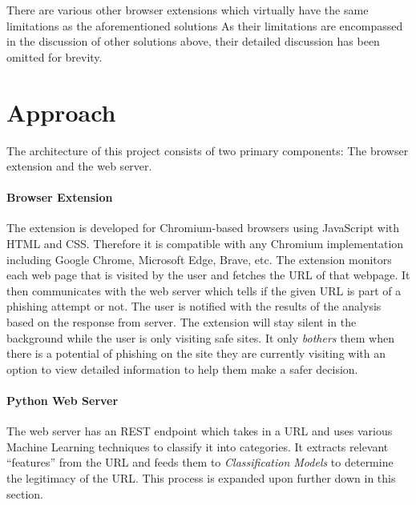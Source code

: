 \documentclass[conference]{IEEEtran}
\begin{document}
\par There are various other browser extensions which virtually have the same limitations as the aforementioned solutions\cite{BlueArca}\cite{Retruster}\cite{PhishingBoat}
As their limitations are encompassed in the discussion of other solutions above, their detailed discussion has been omitted for brevity.

\section{Approach}
The architecture of this project consists of two primary components: The browser extension and the web server.

\paragraph{Browser Extension}
The extension is developed for Chromium-based browsers using JavaScript with HTML and CSS.
Therefore it is compatible with any Chromium implementation including Google Chrome, Microsoft Edge, Brave, etc.
The extension monitors each web page that is visited by the user and fetches the URL of that webpage.
It then communicates with the web server which tells if the given URL is part of a phishing attempt or not.
The user is notified with the results of the analysis based on the response from server.
The extension will stay silent in the background while the user is only visiting safe sites.
It only \emph{bothers} them when there is a potential of phishing on the site they are currently visiting with an option to view detailed information to help them make a safer decision.

\paragraph{Python Web Server}
The web server has an REST endpoint which takes in a URL and uses various Machine Learning techniques to classify it into categories.
It extracts relevant ``features'' from the URL and feeds them to \emph{Classification Models} to determine the legitimacy of the URL.
This process is expanded upon further down in this section.
\end{document}

